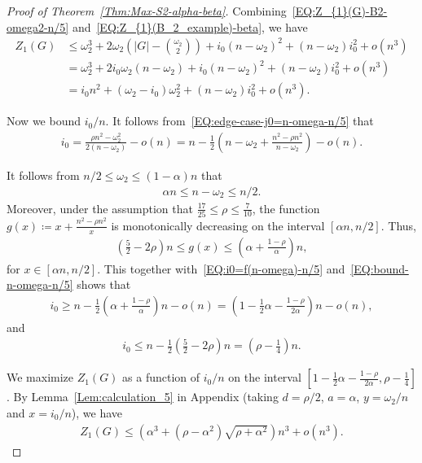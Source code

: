 \documentclass[11pt,a4paper]{article}
\begin{document}
\begin{proof}[Proof of Theorem~\ref{Thm:Max-S2-alpha-beta}]
Combining~\eqref{EQ:Z_{1}(G)-B2-omega2-n/5} and~\eqref{EQ:Z_{1}(B_2_example)-beta}, we have 
\begin{align*}
Z_{1}(G) 
&\le \omega_2^3+ 2 \omega_2 \left(|G| - \binom{\omega_2}{2}\right) + i_0(n- \omega_2)^2+(n- \omega_2)i_0^2 + o(n^3)\\
& = \omega_2^3+2 i_0 \omega_2 (n-\omega_2) + i_0(n- \omega_2)^2+(n- \omega_2)i_0^2 + o(n^3)\\
&= i_0 n^2+(\omega_2-i_0)\omega_2^2+(n- \omega_2)i_0^2 +o(n^3). 
\end{align*}

Now we bound $i_0/n$. 
It follows from~\eqref{EQ:edge-case-j0=n-omega-n/5} that 
\begin{align}\label{EQ:i0=f(n-omega)-n/5}
i_0 
=\frac{\rho n^2 - \omega_2^2}{2(n-\omega_2)} - o(n)
= n- \frac{1}{2}\left(n -\omega_2 + \frac{n^2-\rho n^2}{n-\omega_2}\right) - o(n).
\end{align}

It follows from $n/2 \le \omega_2 \le (1- \alpha)n$ that 
\begin{align}\label{EQ:bound-n-omega-n/5}
\alpha n \le n -\omega_2 \le n/2. 
\end{align}
Moreover, under the assumption that $\frac{17}{25}\le \rho \le \frac{7}{10}$, the function $g(x) \coloneqq x+ \frac{n^2-\rho n^2}{x}$ is monotonically decreasing on the interval $[\alpha n, n/2]$. 
Thus,
\begin{align*}
\left(\frac{5}{2}-2\rho\right)n 
\le g(x) 
\le \left(\alpha+ \frac{1-\rho}{\alpha}\right)n, 
\end{align*}
for $x\in [\alpha n, n/2]$. 
This together with~\eqref{EQ:i0=f(n-omega)-n/5} and~\eqref{EQ:bound-n-omega-n/5} shows that
\begin{align*}
i_0 
\ge n- \frac{1}{2}\left(\alpha+ \frac{1-\rho}{\alpha}\right)n -o(n)
= \left(1- \frac{1}{2}\alpha -\frac{1-\rho}{2 \alpha}\right)n - o(n), 
\end{align*}
and 
\begin{align*}
i_0 
\le n -\frac{1}{2}\left(\frac{5}{2}-2\rho\right)n
= \left(\rho -\frac{1}{4}\right)n. 
\end{align*}

We maximize $Z_{1}(G)$ as a function of $i_0/n$ on the interval $\left[1- \frac{1}{2}\alpha -\frac{1-\rho}{2 \alpha},\rho-\frac{1}{4}\right]$. 
By Lemma~\ref{Lem:calculation_5} in Appendix (taking $d = \rho/2$, $a = \alpha$, $y =\omega_2/n$ and $x= i_0/n$), we have 
\begin{align*}
Z_{1}(G) 
\le \left(\alpha^3+(\rho-\alpha^2) \sqrt{\rho+\alpha^2}\right)n^3 + o(n^3).
\end{align*}



\end{proof}
\end{document}
